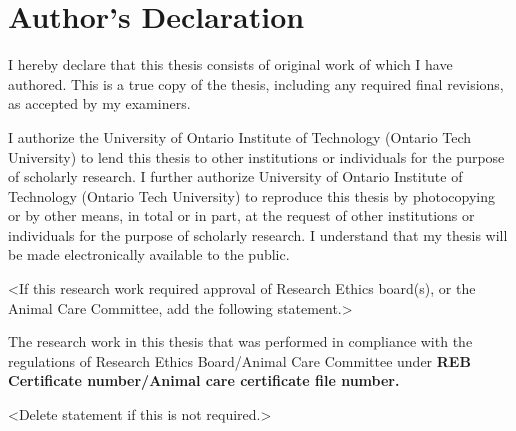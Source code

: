 \chapter*{Author's Declaration}


I hereby declare that this thesis consists of original work of which I have authored. This is a true copy of the thesis, including any required final revisions, as accepted by my examiners.


I authorize the University of Ontario Institute of Technology (Ontario Tech University) to lend this thesis to other institutions or individuals for the purpose of scholarly research. I further authorize University of Ontario Institute of Technology (Ontario Tech University) to reproduce this thesis by photocopying or by other means, in total or in part, at the request of other institutions or individuals for the purpose of scholarly research. I understand that my thesis will be made electronically available to the public.


<If this research work required approval of Research Ethics board(s), or the Animal Care Committee, add the following statement.>


The research work in this thesis that was performed in compliance with the regulations of Research Ethics Board/Animal Care Committee under \textbf{REB Certificate number/Animal care certificate file number.}


<Delete statement if this is not required.>

\bigskip
\bigskip

\makeatletter\textbf{\@firstname\ {\@lastname}}\makeatother